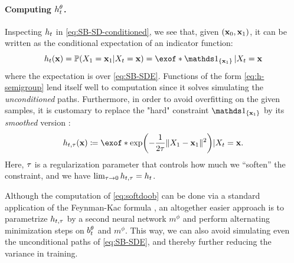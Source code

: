 \paragraph{Computing $h_t^\theta$.}

Inspecting $h_t$ in \eqref{eq:SB-SD-conditioned}, we see that, given $(\mathbf{x}_0,\mathbf{x}_1)$, it can be written as the conditional expectation of an indicator function:
\begin{equation}
\label{eq:h-semigroup}
\doob(\x) = \prob(X_1 = \x_1\vert X_t = \x) = \exof*{
\one_{\{\x_1\}}\vert X_t = \x}
\end{equation}where the expectation is over \eqref{eq:SB-SDE}. Functions of the form \eqref{eq:h-semigroup} lend itself well to computation since it solves simulating the \emph{unconditioned} paths.
Furthermore, in order to avoid overfitting on the given samples, it is customary to replace the "hard" constraint $\one_{\{\x_1\}}$ by its \emph{smoothed} version \citep{zhang2021path, holdijk2022path}: 
\begin{equation}
\label{eq:softdoob}
\doobs(\x) \defeq \exof*{  \exp\parens*{-\frac{1}{2\reg}\norm{X_\horizon-\x_1}^2 }  \vert X_t = \x}.
\end{equation}Here, $\tau$ is a regularization parameter that controls how much we ``soften'' the constraint, and we have $\lim_{\tau\to 0} h_{t,\tau} = h_t$.


Although the computation of \eqref{eq:softdoob} can be done via a standard application of the Feynman-Kac formula \citep{rogers2000diffusions}, an altogether easier approach is to parametrize $h_{t,\tau}$ by a second neural network $m^{\phi}$ and perform alternating minimization steps on $b_t^\theta$ and $m^{\phi}$. This way, we can also avoid simulating even the unconditional paths of \eqref{eq:SB-SDE}, and thereby further reducing the variance in training.



